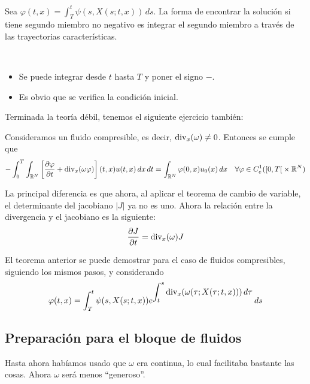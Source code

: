 \begin{ejercicio}\label{ejercicio:ej25} %
    Sea $\varphi(t,x) = \int_{T}^{t} \psi(s, X(s;t,x)) \,ds$.
    La forma de encontrar la solución si tiene segundo miembro no negativo es integrar el segundo miembro a través de las trayectorias características.
\end{ejercicio}

\newpage

\begin{observacion}~
    \begin{itemize}
        \item Se puede integrar desde $t$ hasta $T$ y poner el signo $-$.
        \item Es obvio que se verifica la condición inicial.
    \end{itemize}
\end{observacion}

Terminada la teoría débil, tenemos el siguiente ejercicio también:

\begin{ejercicio} %
    Consideramos un fluido compresible, es decir, $\text{div}_x(\omega) \neq 0$. Entonces se cumple que 
    $$-\int_{0}^{T} \int_{\mathbb{R}^N} \left[ \dfrac{\partial \varphi}{\partial t} + \text{div}_x(\omega \varphi) \right](t,x) u(t,x) \,dx\,dt = \int_{\mathbb{R}^N} \varphi(0,x) u_0(x) \,dx \quad \forall \varphi \in C_c^1(\left[0, T \right[ \times \mathbb{R}^N)$$
\end{ejercicio}

\begin{observacion}
    La principal diferencia es que ahora, al aplicar el teorema de cambio de variable, el determinante del jacobiano $|J|$ ya no es uno. Ahora la relación
    entre la divergencia y el jacobiano es la siguiente:
    $$\dfrac{\partial J}{\partial t} = \text{div}_x(\omega) J$$
\end{observacion}

El teorema anterior se puede demostrar para el caso de fluidos compresibles, siguiendo los mismos pasos, y considerando
$$\varphi(t,x) = \int_{T}^{t} \psi(s,X(s;t,x)) e^{\displaystyle\int_{t}^{s} \text{div}_x(\omega (\tau; X(\tau; t,x))) \,d \tau}\,ds$$

\subsection{Preparación para el bloque de fluidos}

Hasta ahora habíamos usado que $\omega$ era continua, lo cual facilitaba bastante las cosas. Ahora $\omega$ será menos ``generoso''. \\

